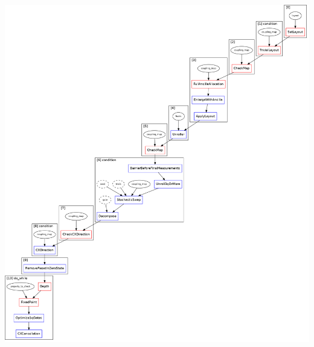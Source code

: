 \documentclass[aspectratio=169,11pt,hyperref={colorlinks=true}]{beamer}
\begin{document}
\begin{frame}
\begin{columns}
{            \includegraphics[width=\textwidth,height=.75\textheight,keepaspectratio]{preset_level_1.png}
    }
\end{columns}
\end{frame}
\end{document}
